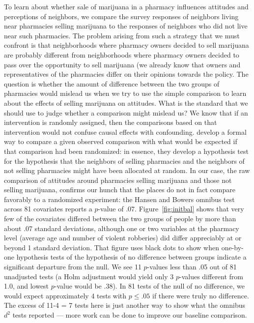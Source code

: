 \documentclass[11pt]{article}
\begin{document}
To learn about whether sale of marijuana in a pharmacy influences attitudes and perceptions of neighbors, we compare the survey responses of neighbors living near pharmacies selling marijuana to the responses of neighbors who did not live near such pharmacies. The problem arising from such a strategy that we must confront is that neighborhoods where pharmacy owners decided to sell marijuana are probably different from neighborhoods where pharmacy owners decided to pass over the opportunity to sell marijuana (we already know that owners and representatives of the pharmacies differ on their opinions towards the policy. The question is whether the amount of difference between the two groups of pharmacies would mislead us when we try to use the simple comparison to learn about the effects of selling marijuana on attitudes. What is the standard that we should use to judge whether a comparison might mislead us? We know that if an intervention is randomly assigned, then the comparisons based on that intervention would not confuse causal effects with confounding. \citep{hansen2008cbs} develop a formal way to compare a given observed comparison with what would be expected if that comparison had been randomized: in essence, they develop a hypothesis test for the hypothesis that the neighbors of selling pharmacies and the neighbors of not selling pharmacies might have been allocated at random. In our case, the raw comparison of attitudes around pharmacies selling marijuana and those not selling marijuana, confirms our hunch that the places do not in fact compare favorably to a randomized experiment:  the Hansen and Bowers omnibus test across 81 covariates reports a $p$-value of .07. Figure~\ref{fig:initbal} shows that very few of the covariates differed between the two groups of people by more than about .07 standard deviations, although one or two variables at the pharmacy level (average age and number of violent robberies) did differ appreciably at or beyond 1 standard deviation. That figure uses black dots to show when one-by-one hypothesis tests of the hypothesis of no difference between groups indicate a significant departure from the null. We see 11 $p$-values less than .05 out of 81 unadjusted tests (a Holm adjustment would yield only 3 $p$-values different from 1.0, and lowest $p$-value would be .38). In 81 tests of the null of no difference, we would expect approximately 4 tests with $p \le .05$ if there were truly no difference. The excess of 11-4 = 7 tests here is just another way to show what the omnibus $d^2$ tests reported --- more work can be done to improve our baseline comparison.
\end{document}
